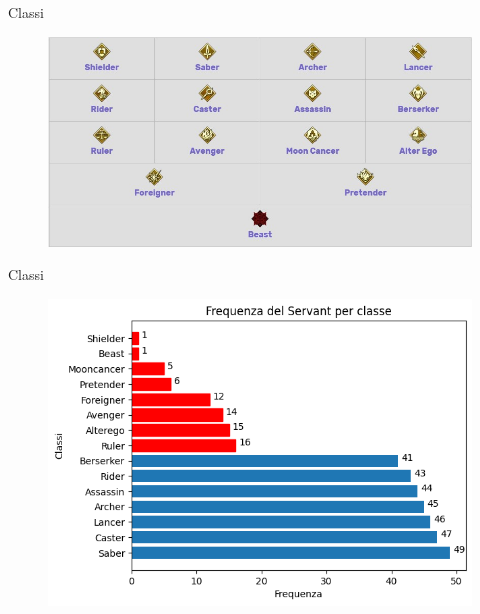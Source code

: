 \documentclass{beamer}
\begin{document}
\begin{darkframes}
  \begin{frame}{Classi}
    \begin{figure}
      \centering
      \includegraphics[height=0.55\textheight]{./images/classes.jpg}
    \end{figure}
  \end{frame}

  \begin{frame}{Classi}
    \begin{figure}
      \centering
      \includegraphics[scale=0.65]{./images/frequency_by_class.png}
    \end{figure}
  \end{frame}


\end{darkframes}
\end{document}
